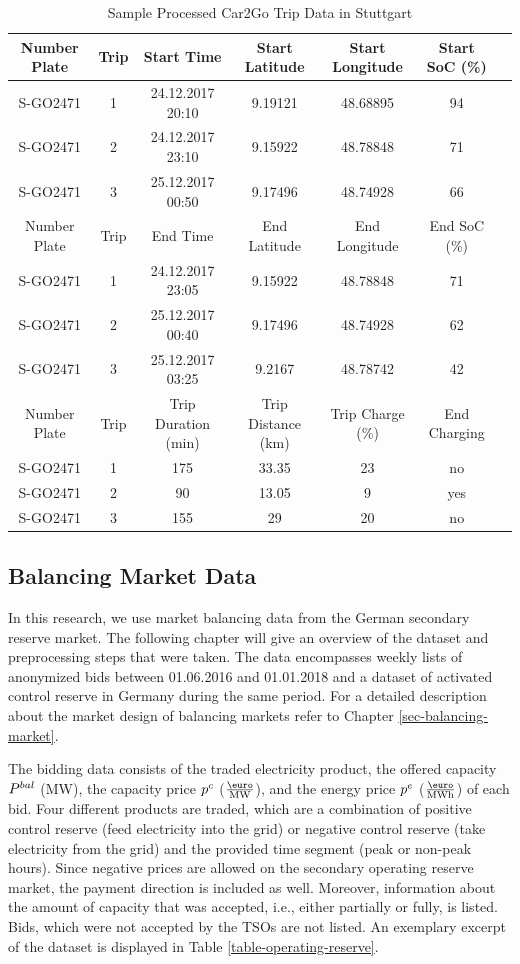 \documentclass[a4paper, 12pt]{article}
\begin{document}
\begin{table}
    \caption{Sample Processed Car2Go Trip Data in Stuttgart \label{table-car2go-processed}}
    \centering
    \begin{tabular}{cc|ccccc}
      \hline
      \hline
      Number Plate & Trip & Start Time & Start Latitude & Start Longitude & Start SoC (\%)\\
      \hline
      S-GO2471 & 1 & 24.12.2017 20:10 & 9.19121 & 48.68895 & 94\\
      S-GO2471 & 2 & 24.12.2017 23:10 & 9.15922 & 48.78848 & 71\\
      S-GO2471 & 3 & 25.12.2017 00:50 & 9.17496 & 48.74928 & 66\\
      \hline
      Number Plate & Trip & End Time & End Latitude & End Longitude & End SoC (\%)\\
      \hline
      S-GO2471 & 1 & 24.12.2017 23:05 & 9.15922 & 48.78848 & 71\\
      S-GO2471 & 2 & 25.12.2017 00:40 & 9.17496 & 48.74928 & 62\\
      S-GO2471 & 3 & 25.12.2017 03:25 & 9.2167 & 48.78742 & 42\\
      \hline
      Number Plate & Trip & Trip Duration (min) & Trip Distance (km) & Trip Charge (\%) & End Charging\\
      \hline
      S-GO2471 & 1 & 175 & 33.35 & 23 & no\\
      S-GO2471 & 2 & 90 & 13.05 & 9 & yes\\
      S-GO2471 & 3 & 155 & 29 & 20 & no\\
      \hline
      \hline
    \end{tabular}
\end{table}

\subsection{Balancing Market Data}
\label{sec:org6121ea0}
In this research, we use market balancing data from the German secondary reserve
market. The following chapter will give an overview of the dataset and
preprocessing steps that were taken. The data encompasses weekly lists of
anonymized bids between 01.06.2016 and 01.01.2018 and a dataset of activated
control reserve in Germany during the same period. For a detailed description
about the market design of balancing markets refer to Chapter
\ref{sec-balancing-market}.

The bidding data consists of the traded electricity product, the offered
capacity \(P^{bal}_{}\) (MW), the capacity price \(p^c_{}\) (\(\emw\)), and the
energy price \(p^e_{}\) (\(\emwh\)) of each bid. Four different products
are traded, which are a combination of positive control reserve (feed
electricity into the grid) or negative control reserve (take electricity from
the grid) and the provided time segment (peak or non-peak hours). Since negative
prices are allowed on the secondary operating reserve market, the payment
direction is included as well. Moreover, information about the amount of
capacity that was accepted, i.e., either partially or fully, is listed. Bids,
which were not accepted by the TSOs are not listed. An exemplary excerpt of the
dataset is displayed in Table \ref{table-operating-reserve}.
\end{document}
